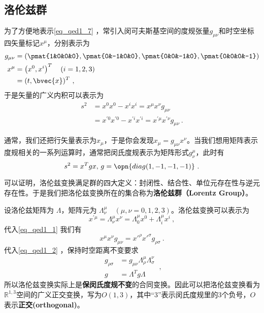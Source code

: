 \subsection{洛伦兹群}
为了方便地表示\autoref{eq_qed1_7} ，常引入闵可夫斯基空间的度规张量$g_{\mu\nu}$和时空坐标四矢量标记$x^{\mu}$，分别表示为
\begin{equation}
\begin{aligned}
g_{\mu \nu}&=(\pmat{1&0&0&0},\pmat{0&-1&0&0},\pmat{0&0&-1&0},\pmat{0&0&0&-1})\\
x^{\mu} &=\left(x^{0}, x^{i}\right)^T \quad(i=1,2,3)\\
&=(t, \bvec{x})^T~,
\end{aligned}
\end{equation}
于是矢量的广义内积可以表示为
\begin{equation}\label{eq_qed1_1}\begin{aligned}
s^{2} &=x^{0} x^{0}-x^{i} x^{i}=x^{\mu} x^{\nu} g_{\mu \nu} \\
&=x^{\prime 0} x^{\prime 0}-x^{\prime i} x^{\prime i}=x^{\prime \mu} x^{\prime \nu} g_{\mu \nu}~.\end{aligned}\end{equation}

通常，我们还把行矢量表示为$x_{\mu}$，于是你会发现$x_{\mu}=g_{\mu\nu}x^{\nu}$。当我们想用矩阵表示度规相关的一系列运算时，通常把闵氏度规表示为矩阵形式$g^{\mu}_{\nu}$，此时有
\begin{equation}
s^2=x^Tgx,\,g=\opn{diag(1,-1,-1,-1)}~.
\end{equation}



可以证明，洛伦兹变换满足群的四大定义：封闭性、结合性、单位元存在性与逆元存在性。于是我们把洛伦兹变换所在的集合称为\textbf{洛伦兹群（Lorentz Group）}。



设洛伦兹矩阵为 $\Lambda$，矩阵元为 $\Lambda_{\nu}^{\mu}\quad(\mu,\nu=0,1,2,3)$。洛伦兹变换可以表示为
\begin{equation}\label{eq_qed1_2}x^{\prime \mu}=\Lambda_{\nu}^{\mu} x^{\nu}=\Lambda_{0}^{\mu} x^{0}+\Lambda_{i}^{\mu} x^{i}~,\end{equation}
代入\autoref{eq_qed1_1} 我们有
\begin{equation}
x^{\mu} x^{\nu} g_{\mu \nu}=x'^{\rho} x'^{\sigma} g_{\rho \sigma}~.
\end{equation}
代入\autoref{eq_qed1_2} ，保持时空距离不变要求
\begin{equation}\label{eq_qed1_3}
\begin{aligned}
g_{\rho \sigma}&=g_{\mu \nu} \Lambda_{\rho}^{\mu} \Lambda_{\sigma}^{\nu}\\
g&=\Lambda^Tg\Lambda
\end{aligned}~,
\end{equation}
所以洛伦兹变换实际上是\textbf{保闵氏度规不变}的合同变换。因此可以把洛伦兹变换看为$\mathbb R^{1,3}$空间的广义正交变换，写为$O(1,3)$，其中“3”表示闵氏度规里的3个负号，$O$表示\textbf{正交(orthogonal)}。

